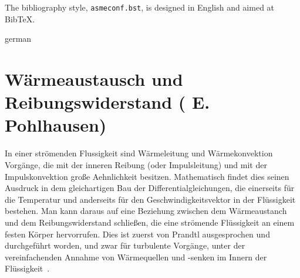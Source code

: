 \documentclass[captionpatch,colorlinks,upint,subscriptcorrection,varvw,german]{asmeconf}
\begin{document}
The bibliography style, \texttt{asmeconf.bst}, is designed in English and aimed at Bib\TeX{}.


\begin{selectlanguage}{german}%
\section{Wärmeaustausch und Reibungswiderstand ( E. Pohlhausen)}\label{app:pohlhausen}
In einer strömenden Flussigkeit sind Wärmeleitung und Wärmekonvektion Vorgänge, die mit der inneren Reibung (oder Impulsleitung) und mit der Impulskonvektion große Aehnlichkeit besitzen. Mathematisch findet dies seinen Ausdruck in dem gleichartigen Bau der Differentialgleichungen, die einerseits für die Temperatur und anderseits für den Geschwindigkeitsvektor in der Flüssigkeit bestehen. Man kann daraus auf eine Beziehung
zwischen dem Wärmeaustanch und dem Reibungswiderstand schließen, die eine strömende Flüssigkeit an einem festen Körper hervorrufen. Dies ist zuerst von Prandtl ausgesprochen und durchgeführt worden, und zwar für turbulente Vorgänge, unter der vereinfachenden Annahme von Wärmequellen und -senken im Innern der Flüssigkeit~\cite{pohlhausen1921}.
\end{selectlanguage}%

\end{document}
